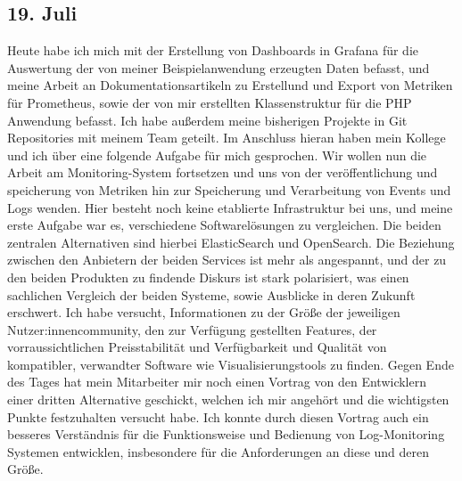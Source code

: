 \subsection{19. Juli}
Heute habe ich mich mit der Erstellung von Dashboards in Grafana für die Auswertung der von meiner Beispielanwendung erzeugten Daten befasst, und meine Arbeit an Dokumentationsartikeln zu Erstellund und Export von Metriken für Prometheus, sowie der von mir erstellten Klassenstruktur für die PHP Anwendung befasst. Ich habe außerdem meine bisherigen Projekte in Git Repositories mit meinem Team geteilt.
Im Anschluss hieran haben mein Kollege und ich über eine folgende Aufgabe für mich gesprochen. Wir wollen nun die Arbeit am Monitoring-System fortsetzen und uns von der veröffentlichung und speicherung von Metriken hin zur Speicherung und Verarbeitung von Events und Logs wenden. Hier besteht noch keine etablierte Infrastruktur bei uns, und meine erste Aufgabe war es, verschiedene Softwarelösungen zu vergleichen. Die beiden zentralen Alternativen sind hierbei ElasticSearch und OpenSearch. Die Beziehung zwischen den Anbietern der beiden Services ist mehr als angespannt, und der zu den beiden Produkten zu findende Diskurs ist stark polarisiert, was einen sachlichen Vergleich der beiden Systeme, sowie Ausblicke in deren Zukunft erschwert. Ich habe versucht, Informationen zu der Größe der jeweiligen Nutzer:innencommunity, den zur Verfügung gestellten Features, der vorraussichtlichen Preisstabilität und Verfügbarkeit und Qualität von kompatibler, verwandter Software wie Visualisierungstools zu finden. 
Gegen Ende des Tages hat mein Mitarbeiter mir noch einen Vortrag von den Entwicklern einer dritten Alternative geschickt, welchen ich mir angehört und die wichtigsten Punkte festzuhalten versucht habe. Ich konnte durch diesen Vortrag auch ein besseres Verständnis für die Funktionsweise und Bedienung von Log-Monitoring Systemen entwicklen, insbesondere für die Anforderungen an diese und deren Größe.
